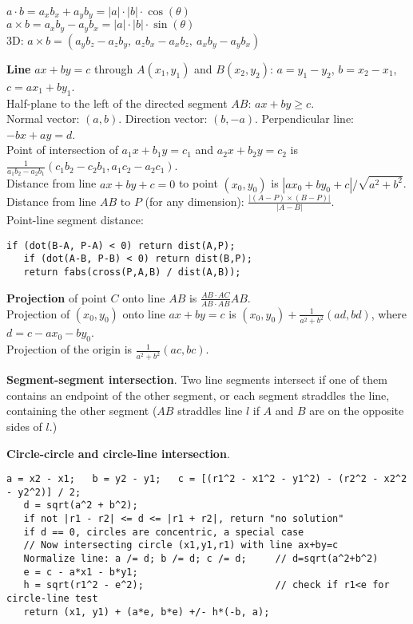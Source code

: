 \documentclass[a4paper, 12pt]{article}
\let\ge=\geqslant
\newcommand{\Topic}[1]{\textbf{#1}}
\begin{document}
$a \cdot b = a_x b_x + a_y b_y = |a| \cdot |b| \cdot \cos(\theta)$ \\
$a \times b = a_x b_y - a_y b_x = |a| \cdot |b| \cdot \sin(\theta)$ \\
3D: $a \times b = (a_y b_z - a_z b_y,\ a_z b_x - a_x b_z,\ a_x b_y - a_y b_x)$

\Topic{Line} $ax+by=c$ through $A(x_1, y_1)$ and $B(x_2, y_2)$:
$a=y_1 - y_2$, $b = x_2 - x_1$, $c=ax_1+by_1$. \\
Half-plane to the left of the directed segment $AB$: $ax + by \ge c$. \\
Normal vector: $(a, b)$. Direction vector: $(b, -a)$.
Perpendicular line: $-bx + ay = d$. \\
Point of intersection of $a_1 x + b_1 y = c_1$ and $a_2 x + b_2 y = c_2$ is
$\frac{1}{a_1 b_2 - a_2 b_1} (c_1 b_2 - c_2 b_1, a_1 c_2 - a_2 c_1)$. \\
Distance from line $ax+by+c=0$ to point $(x_0, y_0)$ is
$|a x_0 + b y_0 + c| / \sqrt{a^2 + b^2}$. \\ %
Distance from line $AB$ to $P$ (for any dimension): $\frac{|(A-P) \times (B-P)|}{|A-B|}$. \\
Point-line segment distance:
\vspace{-6mm}
\begin{Verbatim}[fontsize=\small]
   if (dot(B-A, P-A) < 0) return dist(A,P);
   if (dot(A-B, P-B) < 0) return dist(B,P);
   return fabs(cross(P,A,B) / dist(A,B));    
\end{Verbatim}
\vspace{-3mm}

\Topic{Projection} of point $C$ onto line $AB$ is
$\frac{AB \cdot AC}{AB \cdot AB} AB$. \\
Projection of $(x_0, y_0)$ onto line $ax+by=c$ is
$(x_0, y_0) + \frac{1}{a^2 + b^2}(ad, bd)$, where $d = c - ax_0 - by_0$. \\
Projection of the origin is $\frac{1}{a^2 + b^2}(ac, bc)$.

\Topic{Segment-segment intersection}.
Two line segments intersect if one of them contains an endpoint of the other segment,
or each segment straddles the line, containing the other segment
($AB$ straddles line $l$ if $A$ and $B$ are on the opposite sides of $l$.)

\Topic{Circle-circle and circle-line intersection}.
\vspace{-5mm}
\begin{Verbatim}[fontsize=\small, tabsize=4]
   a = x2 - x1;   b = y2 - y1;   c = [(r1^2 - x1^2 - y1^2) - (r2^2 - x2^2 - y2^2)] / 2;
   d = sqrt(a^2 + b^2);
   if not |r1 - r2| <= d <= |r1 + r2|, return "no solution"
   if d == 0, circles are concentric, a special case
   // Now intersecting circle (x1,y1,r1) with line ax+by=c
   Normalize line: a /= d; b /= d; c /= d;     // d=sqrt(a^2+b^2)
   e = c - a*x1 - b*y1;
   h = sqrt(r1^2 - e^2);                       // check if r1<e for circle-line test
   return (x1, y1) + (a*e, b*e) +/- h*(-b, a);
\end{Verbatim}
\vspace{-3mm}
\end{document}
